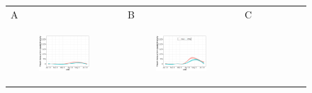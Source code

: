 \documentclass[11pt]{article}
\begin{document}
\begin{figure}[ht]
	\begin{tabular}{lll}
	A&B&C\\
	\begin{subfigure}[t]{0.3\linewidth}
		\centering
		\includegraphics[width=1\linewidth]{figs/figure-3a-cook-40-59.pdf} 
	\end{subfigure}&
	\begin{subfigure}[t]{0.3\linewidth}
		\centering
		\includegraphics[width=1\linewidth]{figs/figure-3b-cook-60-74.pdf}
	\end{subfigure}&
	\begin{subfigure}[t]{0.3\linewidth}
		\centering

\end{subfigure}
\end{tabular}
\end{figure}
\end{document}
